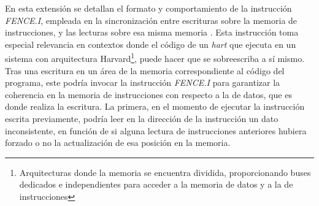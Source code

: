 En esta extensión se detallan el formato y comportamiento de la instrucción \textit{FENCE.I}, empleada en la sincronización entre escrituras sobre la memoria de instrucciones, y las lecturas sobre esa misma memoria \cite{riscv-unpriv-isa-20250508-zifencei}.
Esta instrucción toma especial relevancia en contextos donde el código de un \textit{hart} que ejecuta en un sistema con arquitectura Harvard\footnote{Arquitecturas donde la memoria se encuentra dividida, proporcionando buses dedicados e independientes para acceder a la memoria de datos y a la de instrucciones}, puede hacer que se sobreescriba a sí mismo. Tras una escritura en un área de la memoria correspondiente al código del programa, este podría invocar la instrucción \textit{FENCE.I} para garantizar la coherencia en la memoria de instrucciones con respecto a la de datos, que es donde realiza la escritura. La primera, en el momento de ejecutar la instrucción escrita previamente, podría leer en la dirección de la instrucción un dato inconsistente, en función de si alguna lectura de instrucciones anteriores hubiera forzado o no la actualización de esa posición en la memoria.
